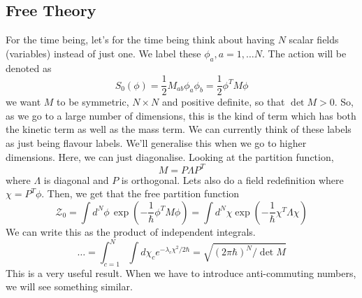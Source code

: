 \documentclass[11pt, oneside]{article}   	%
\theoremstyle{slanted}
\begin{document}
\subsection{Free Theory}
For the time being, let's 
for the time being think about having $ N $ 
scalar fields (variables) instead of just one.
We label these
$ \phi _ a , a = 1 , \dots N $. 
The action will be denoted as 
\[
 S _ 0 \left( \phi  \right)   = 
 \frac{1}{2 } M _{ ab} \phi _ a \phi _ b  = \frac{1}{2 } \phi ^ T M \phi 
\] we want $ M $ to be symmetric, $ N \times N $ and positive 
definite, so that $ \det M > 0 $. 
So, as we go to a large number of dimensions, 
this is the kind of term which has both the 
kinetic term as well as the mass term. 
We can currently think of these labels 
as just being flavour labels. 
We'll generalise this when we go to higher dimensions. 
Here, we can just diagonalise. 
Looking at the partition function, 
\[
 M = P \Lambda P ^ T 
\] where $ \Lambda $ is diagonal and $ P $ is orthogonal. 
Lets also do a field redefinition where 
$ \chi  = P ^ T \phi $. 
Then, we get that the free partition function 
\[
	\mathcal{ Z } _ 0  = \int d ^ N \phi \, \exp \left( 
	 - \frac{1}{\hbar} \phi ^ T M \phi \right)  = 
	 \int d ^ N \chi \exp  \left(  - \frac{1}{\hbar } 
	 \chi ^ T \Lambda \chi \right) 
\] We can write this as the product of independent 
integrals. 
\[
 \dots  = \int_{ c = 1 } ^ N \int d \chi _ c e ^{
  - \lambda _ c \chi ^ 2  / 2 \hbar }  = \sqrt{ 
  \left( 2 \pi \hbar  \right)  ^{ N } / \det M } 
\] This 
is a very useful result. 
When we have to introduce anti-commuting numbers, 
we will see something similar. 
\end{document}
